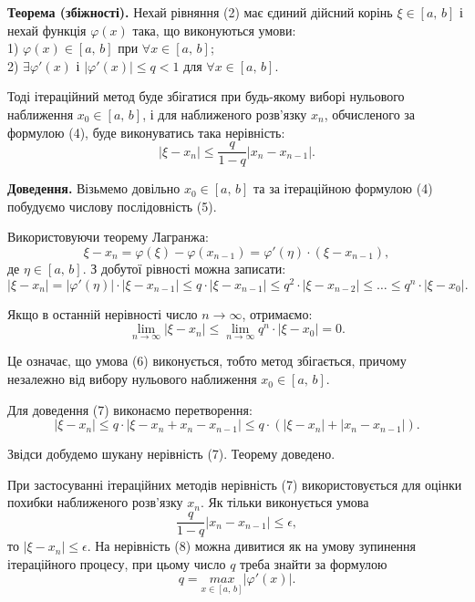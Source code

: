 \documentclass[14pt,a4paper,titlepage]{extarticle}
\begin{document}
{\bf Теорема (збіжності).} Нехай рівняння (2) має єдиний дійсний корінь $\xi\in[a,\, b]$ і нехай функція $\varphi(x)$ така, що виконуються умови:
\\
1) $\varphi(x)\in[a,\, b]$ при $\forall x\in[a,\, b]$;
\\
2) $\exists\varphi'(x)$ і $\left|\varphi'(x)\right|\leqslant q<1$ для $\forall x\in[a,\, b]$.

Тоді ітераційний метод буде збігатися при будь-якому виборі нульового наближення $x_0\in[a,\, b]$, і для наближеного розв'язку $x_n$, обчисленого за формулою (4), буде виконуватись така нерівність:
\begin{equation}
\left|\xi-x_n\right|\leqslant\frac{q}{1-q}\left|x_n-x_{n-1}\right|.
\end{equation}

{\bf Доведення.} Візьмемо довільно $x_0\in[a,\, b]$ та за ітераційною формулою (4) побудуємо числову послідовність (5).

Використовуючи теорему Лагранжа:
$$\xi-x_n=\varphi(\xi)-\varphi(x_{n-1})=\varphi'(\eta)\cdot(\xi-x_{n-1}),$$
де $\eta\in[a,\, b]$. З добутої рівності можна записати:
$$\left|\xi-x_n\right|=\left|\varphi'(\eta)\right|\cdot\left|\xi-x_{n-1}\right|\leqslant q\cdot\left|\xi-x_{n-1}\right|\leqslant q^2\cdot\left|\xi-x_{n-2}\right|\leqslant\ldots\leqslant q^n\cdot\left|\xi-x_0\right|.$$ 

Якщо в останній нерівності число $n\to\infty$, отримаємо:
$$\lim_{n\to\infty}\left|\xi-x_n\right|\leqslant\lim_{n\to\infty}q^n\cdot\left|\xi-x_0\right|=0.$$

Це означає, що умова (6) виконується, тобто метод збігається, причому незалежно від вибору нульового наближення $x_0\in[a,\, b]$.

Для доведення (7) виконаємо перетворення:
$$\left|\xi-x_n\right|\leqslant q\cdot\left|\xi-x_n+x_n-x_{n-1}\right|\leqslant q\cdot(\left|\xi-x_n\right|+\left|x_n-x_{n-1}\right|).$$

Звідси добудемо шукану нерівність (7). Теорему доведено.

При застосуванні ітераційних методів нерівність (7) використовується для оцінки похибки наближеного розв'язку $x_n$. Як тільки виконується умова
\begin{equation}
\frac{q}{1-q}\left|x_n-x_{n-1}\right|\leqslant\epsilon,
\end{equation}
то $\left|\xi-x_n\right|\leqslant\epsilon$. На нерівність (8) можна дивитися як на умову зупинення ітераційного процесу, при цьому число $q$ треба знайти за формулою
\begin{equation} 
q=\underset{x\in [a,\, b]}{max}\left|\varphi'(x)\right|.
\end{equation}
\end{document}
